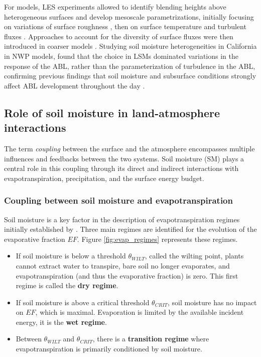 For models, LES experiments allowed to identify blending heights above heterogeneous surfaces and develop mesoscale parametrizations, initially focusing on variations of surface roughness \citep{bou-zeid_large-eddy_2004}, then on surface temperature and turbulent fluxes \citep{stoll_surface_2009}. Approaches to account for the diversity of surface fluxes were then introduced in coarser models \citep{ament_improved_2006}. Studying soil moisture heterogeneities in California in NWP models, \citet{alexander_simulating_2022} found that the choice in LSMs dominated variations in the response of the ABL, rather than the parameterization of turbulence in the ABL, confirming previous findings that soil moisture and subsurface conditions strongly affect ABL development throughout the day \citep{rihani_isolating_2015}.

\subsection{Role of soil moisture in land-atmosphere interactions}

The term \textit{coupling} between the surface and the atmosphere encompasses multiple influences and feedbacks between the two systems. Soil moisture (SM) plays a central role in this coupling through its direct and indirect interactions with evapotranspiration, precipitation, and the surface energy budget.

\subsubsection*{Coupling between soil moisture and evapotranspiration}

Soil moisture is a key factor in the description of evapotranspiration regimes initially established by \citet{Budyko_1956, Budyko_1974}. Three main regimes are identified for the evolution of the evaporative fraction $EF$. Figure \ref{fig:evap_regimes} represents these regimes.

\begin{itemize}
    \item If soil moisture is below a threshold $\theta_{WILT}$, called the wilting point, plants cannot extract water to transpire, bare soil no longer evaporates, and evapotranspiration (and thus the evaporative fraction) is zero. This first regime is called the \textbf{dry regime}.
    \item If soil moisture is above a critical threshold $\theta_{CRIT}$, soil moisture has no impact on $EF$, which is maximal. Evaporation is limited by the available incident energy, it is the \textbf{wet regime}.
    \item Between $\theta_{WILT}$ and $\theta_{CRIT}$, there is a \textbf{transition regime} where evapotranspiration is primarily conditioned by soil moisture. 
\end{itemize}

